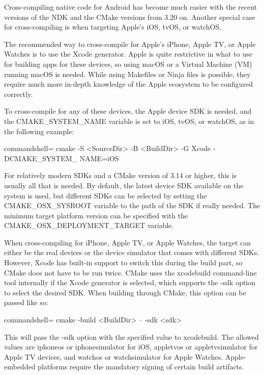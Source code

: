 Cross-compiling native code for Android has become much easier with the recent versions of the NDK and the CMake versions from 3.20 on. Another special case for cross-compiling is when targeting Apple's iOS, tvOS, or watchOS.


The recommended way to cross-compile for Apple's iPhone, Apple TV, or Apple Watches is to use the Xcode generator. Apple is quite restrictive in what to use for building apps for these devices, so using macOS or a Virtual Machine (VM) running macOS is needed. While using Makefiles or Ninja files is possible, they require much more in-depth knowledge of the Apple ecosystem to be configured correctly.

To cross-compile for any of these devices, the Apple device SDK is needed, and the CMAKE\_SYSTEM\_NAME variable is set to iOS, tvOS, or watchOS, as in the following example:

\begin{tcblisting}{commandshell={}}
cmake -S <SourceDir> -B <BuildDir> -G Xcode -DCMAKE_SYSTEM_
  NAME=iOS
\end{tcblisting}

For relatively modern SDKs and a CMake version of 3.14 or higher, this is usually all that is needed. By default, the latest device SDK available on the system is used, but different SDKs can be selected by setting the CMAKE\_OSX\_SYSROOT variable to the path of the SDK if really needed. The minimum target platform version can be specified with the CMAKE\_OSX\_DEPLOYMENT\_TARGET variable.

When cross-compiling for iPhone, Apple TV, or Apple Watches, the target can either be the real devices or the device simulator that comes with different SDKs. However, Xcode has built-in support to switch this during the build part, so CMake does not have to be run twice. CMake uses the xcodebuild command-line tool internally if the Xcode generator is selected, which supports the -sdk option to select the desired SDK. When building through CMake, this option can be passed like so:

\begin{tcblisting}{commandshell={}}
cmake -build <BuildDir> -- -sdk <sdk>
\end{tcblisting}

This will pass the -sdk option with the specified value to xcodebuild. The allowed values are iphoneos or iphonesimulator for iOS, appletvos or appletvsimulator for Apple TV devices, and watchos or watchsimulator for Apple Watches. Apple-embedded platforms require the mandatory signing of certain build artifacts.

